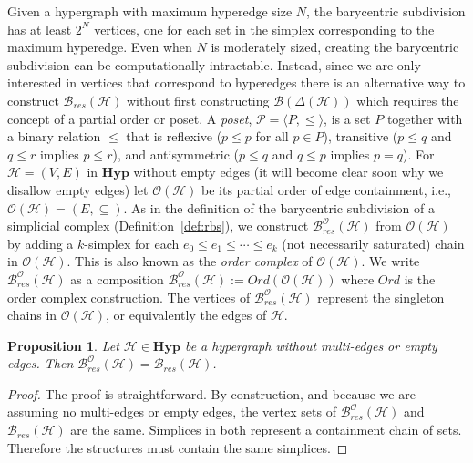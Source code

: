 \documentclass{amsart}
\newtheorem{proposition}[theorem]{Proposition}
\newcommand{\Hyp}{\mathrm{\textbf{Hyp}}}
\renewcommand{\H}{\mathcal{H}}
\newcommand{\bary}{\mathcal{B}}
\newcommand{\ECP}{\mathcal{O}}
\newcommand{\Ord}{Ord}
\newcommand{\cEP}[1]{{\textcolor{blue}{[Comment from Emilie: #1]}}}
\begin{document}
Given a hypergraph with maximum hyperedge size $N$, the barycentric subdivision has at least $2^N$ vertices, one for each set in the simplex corresponding to the maximum hyperedge. 
Even when $N$ is moderately sized, creating the barycentric subdivision can be computationally intractable. 
Instead, since we are only interested in vertices that correspond to hyperedges there is an alternative way to construct $\bary_{res}(\H)$ without first constructing $\bary(\Delta(\H))$ which requires the concept of a partial order or poset.
A \emph{poset}, $\mathcal{P} = \langle P, \leq \rangle$, is a set $P$ together with a binary relation $\leq$ that is reflexive ($p\leq p$ for all $p\in P$), transitive ($p\leq q$ and $q\leq r$ implies $p \leq r$), and antisymmetric ($p\leq q$ and $q\leq p$ implies $p=q$).
For $\H=(V, E)$ in $\Hyp$ without empty edges (it will become clear soon why we disallow empty edges) let $\ECP(\H)$ be its partial order of edge containment, i.e., $\ECP(\H) = (E, \subseteq)$.
As in the definition of the barycentric subdivision of a simplicial complex (Definition~\ref{def:rbs}), we construct $\bary_{res}^\ECP(\H)$ from $\ECP(\H)$ by adding a $k$-simplex for each $e_{0} \leq e_{1} \leq \cdots \leq e_{k}$ (not necessarily saturated) chain in $\ECP(\H)$. This is also known as the \emph{order complex} of $\ECP(\H)$.
We write $\bary_{res}^\ECP(\H)$ as a composition $\bary_{res}^\ECP(\H) := \Ord(\ECP(\H))$ where $\Ord$ is the order complex construction.
The vertices of $\bary_{res}^\ECP(\H)$ represent the singleton chains in $\ECP(\H)$, or equivalently the edges of $\H$.


\begin{proposition}
\label{prop:bary_res_alt}
Let $\H \in \Hyp$ be a hypergraph without multi-edges or empty edges. Then $\bary_{res}^\ECP(\H) = \bary_{res}(\H)$. 
\end{proposition}
\begin{proof}
The proof is straightforward.
By construction, and because we are assuming no multi-edges or empty edges, the vertex sets of $\bary_{res}^\ECP(\H)$ and $\bary_{res}(\H)$ are the same. 
Simplices in both represent a containment chain of sets. 
Therefore the structures must contain the same simplices.
\end{proof}
\end{document}
